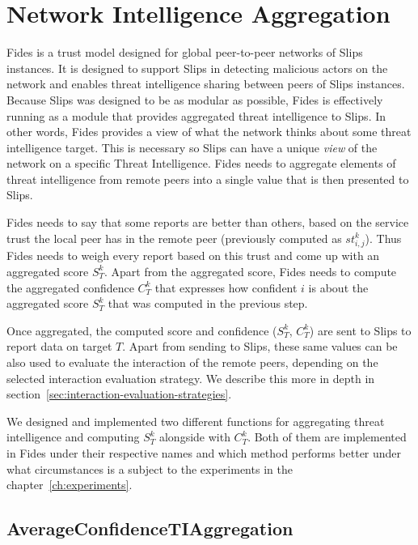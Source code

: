 \section{Network Intelligence Aggregation}
\label{sec:network-intelligence-aggregation}
Fides is a trust model designed for global peer-to-peer networks of Slips instances.
It is designed to support Slips in detecting malicious actors on the network and enables threat intelligence sharing between peers of Slips instances.
Because Slips was designed to be as modular as possible, Fides is effectively running as a module that provides aggregated threat intelligence to Slips. 
In other words, Fides provides a view of what the network thinks about some threat intelligence target. This is necessary so Slips can have a unique \textit{view} of the network on a specific Threat Intelligence.
Fides needs to aggregate elements of threat intelligence from remote peers into a single value that is then presented to Slips.

Fides needs to say that some reports are better than others, based on the service trust the local peer has in the remote peer (previously computed as $st^{k}_{i, j}$).
Thus Fides needs to weigh every report based on this trust and come up with an aggregated score $S^{k}_{T}$.
Apart from the aggregated score, Fides needs to compute the aggregated confidence $C^{k}_{T}$ that expresses how confident $i$ is about the aggregated score $S^{k}_{T}$ that was computed in the previous step.

Once aggregated, the computed score and confidence ($S^{k}_{T}$, $C^{k}_{T}$) are sent to Slips to report data on target $T$.
Apart from sending to Slips, these same values can be also used to evaluate the interaction of the remote peers, depending on the selected interaction evaluation strategy. We describe this more in depth in section~\ref{sec:interaction-evaluation-strategies}.

We designed and implemented two different functions for aggregating threat intelligence and computing $S^{k}_{T}$ alongside with $C^{k}_{T}$.
Both of them are implemented in Fides under their respective names and which method performs better under what circumstances is a subject to the experiments in the chapter~\ref{ch:experiments}.

\subsection{AverageConfidenceTIAggregation}
\label{subsec:AverageConfidenceTIAggregation}

